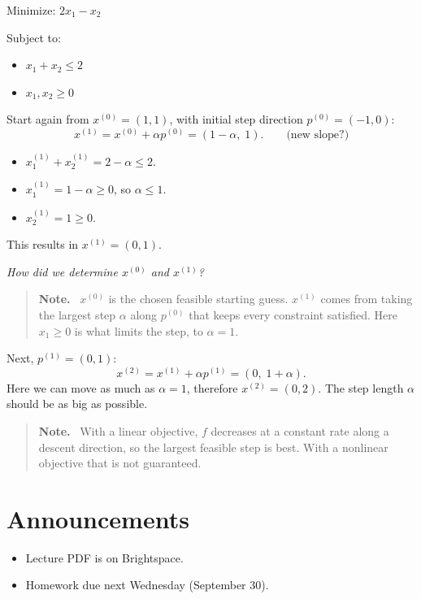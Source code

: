 \documentclass[11pt]{article}
\newenvironment{aside}{\begin{quote}\small\color{black!65}\textbf{Note.}\ }{\end{quote}}
\begin{document}
Minimize: $2x_1 - x_2$

Subject to:
\begin{itemize}
    \item $x_1 + x_2 \le 2$
    \item $x_1, x_2 \ge 0$
\end{itemize}

Start again from $x^{(0)} = (1, 1)$, with initial step direction
$p^{(0)} = (-1, 0)$:
\[
    x^{(1)} = x^{(0)} + \alpha p^{(0)} = (1 - \alpha,\; 1). \qquad \text{(new slope?)}
\]
\begin{itemize}
    \item $x_1^{(1)} + x_2^{(1)} = 2 - \alpha \le 2$.
    \item $x_1^{(1)} = 1 - \alpha \ge 0$, so $\alpha \le 1$.
    \item $x_2^{(1)} = 1 \ge 0$.
\end{itemize}
This results in $x^{(1)} = (0, 1)$.

\emph{How did we determine $x^{(0)}$ and $x^{(1)}$?}

\begin{aside}
$x^{(0)}$ is the chosen feasible starting guess. $x^{(1)}$ comes from taking the
largest step $\alpha$ along $p^{(0)}$ that keeps every constraint satisfied. Here
$x_1 \ge 0$ is what limits the step, to $\alpha = 1$.
\end{aside}

Next, $p^{(1)} = (0, 1)$:
\[
    x^{(2)} = x^{(1)} + \alpha p^{(1)} = (0,\; 1 + \alpha).
\]
Here we can move as much as $\alpha = 1$, therefore $x^{(2)} = (0, 2)$. The step
length $\alpha$ should be as big as possible.

\begin{aside}
With a linear objective, $f$ decreases at a constant rate along a descent
direction, so the largest feasible step is best. With a nonlinear objective that is
not guaranteed.
\end{aside}

\section*{Announcements}

\begin{itemize}
    \item Lecture PDF is on Brightspace.
    \item Homework due next Wednesday (September 30).
\end{itemize}
\end{document}
